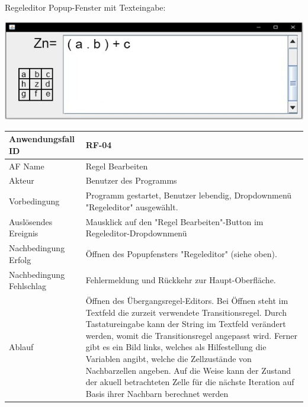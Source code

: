 \documentclass[11pt,a4paper]{article}
\begin{document}
	\pagebreak
	\par
	Regeleditor Popup-Fenster mit Texteingabe:
	\par
	\includegraphics[width=15cm]{regedit}
	\par
	\begin{tabular}[m]{|m{5cm}|m{11cm}|}
		\hline
		Anwendungsfall ID     & RF-04 \\ %
		\hline
		AF Name     &  Regel Bearbeiten \\
		\hline
		Akteur&Benutzer des Programms \\
		\hline
		Vorbedingung&Programm gestartet, Benutzer lebendig, Dropdownmenü "Regeleditor" ausgewählt.\\
		\hline
		Auslösendes Ereignis&Mausklick auf den "Regel Bearbeiten"-Button im Regeleditor-Dropdownmenü\\
		\hline
		Nachbedingung Erfolg&Öffnen des Popupfensters "Regeleditor" (siehe oben).\\
		\hline
		Nachbedingung Fehlschlag&Fehlermeldung und Rückkehr zur Haupt-Oberfläche.\\
		\hline
		Ablauf&Öffnen des Übergangsregel-Editors. Bei Öffnen steht im Textfeld die zurzeit verwendete Transitionsregel. Durch Tastatureingabe kann der String im Textfeld verändert werden, womit die Transitionsregel angepasst wird. Ferner gibt es ein Bild links, welches als Hilfestellung die Variablen angibt, welche die Zellzustände von Nachbarzellen angeben. Auf die Weise kann der Zustand der akuell betrachteten Zelle für die nächste Iteration auf Basis ihrer Nachbarn berechnet werden\\
		\hline
	\end{tabular}
	\par
	
\end{document}
